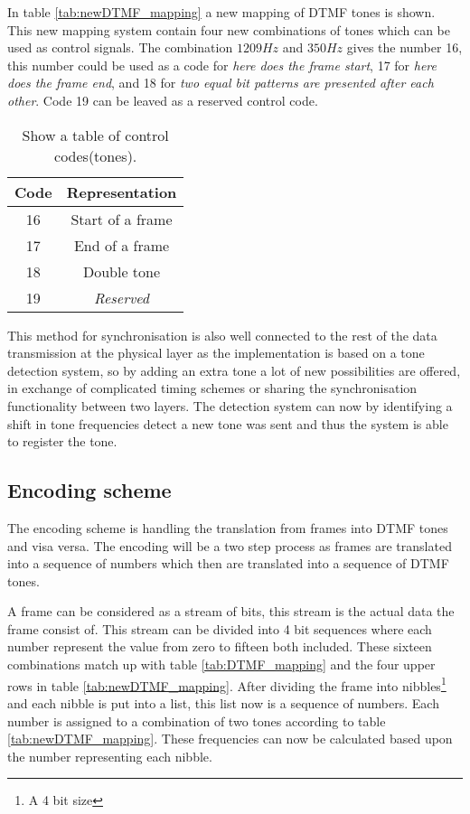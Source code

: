 	In table \ref{tab:newDTMF_mapping} a new mapping of DTMF tones is shown. This new mapping system contain four new combinations of tones
	which can be used as control signals. The combination $1209 Hz$ and $350 Hz$ gives the number 16, this number could be used as a code for
	\textit{here does the frame start}, 17 for \textit{here does the frame end}, and 18 for \textit{two equal bit patterns are presented after
	each other}. Code 19 can be leaved as a reserved control code. 
	
	\begin{table}[htb]
			\begin{center}
				\begin{tabular}{|c|c|}
				\hline
				\textbf{Code} & \textbf{Representation}\\
				\hline
				16 & Start of a frame \\
				\hline
				17 & End of a frame \\
				\hline
				18 & Double tone \\
				\hline
				19 & \textit{Reserved} \\
				\hline
				\end{tabular}
			\end{center}
			\caption{Show a table of control codes(tones).}
			\label{tab:physical_control_tones}
	\end{table}
	
	This method for synchronisation is also well connected to the rest of the
	data transmission at the physical layer as the implementation is based on a tone detection system, so by adding an extra tone a lot of new
	possibilities are offered, in exchange of complicated timing schemes or sharing the synchronisation functionality between two layers.
	The detection system can now by identifying a shift in tone frequencies detect a new tone was sent and thus the system is able to
	register the tone.
	
	\subsection{Encoding scheme}\label{sub:encoding_scheme}
	The encoding scheme is handling the translation from frames into DTMF tones and visa versa. The encoding will be a
	two step process as frames are translated into a sequence of numbers which then are translated into a sequence of DTMF
	tones.
	
	A frame can be considered as a stream of bits, this stream is the actual data the frame consist of. This stream can be divided
	into 4 bit sequences where each number represent the value from zero to fifteen both included. These sixteen combinations
	match up with table \ref{tab:DTMF_mapping} and the four upper rows in table \ref{tab:newDTMF_mapping}. After dividing the 
	frame into nibbles\footnote{A 4 bit size} and each nibble is put into a list, this list now is a sequence of numbers. Each
	number is assigned to a combination of two tones according to table \ref{tab:newDTMF_mapping}. These frequencies can now be
	calculated based upon the number representing each nibble.
	
